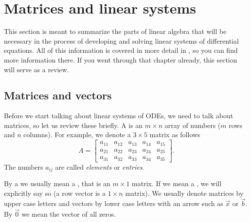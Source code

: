 \section{Matrices and linear systems} \label{sec:matrix}



This section is meant to summarize the parts of linear algebra that will be necessary in the process of developing and solving linear systems of differential equations. All of this information is covered in more detail in , so you can find more information there. If you went through that chapter already, this section will serve as a review.

\subsection{Matrices and vectors}

Before we start talking about linear systems of ODEs, we need to
talk about matrices, so let us review these briefly.  A \emph{}
is an $m
\times n$ array of numbers ($m$ rows and $n$ columns).  For example, we denote
a $3 \times 5$ matrix as follows
\begin{equation*}
A = 
\begin{bmatrix}
a_{11} & a_{12} & a_{13} & a_{14} & a_{15} \\
a_{21} & a_{22} & a_{23} & a_{24} & a_{25} \\
a_{31} & a_{32} & a_{33} & a_{34} & a_{35}
\end{bmatrix} .
\end{equation*}
The numbers $a_{ij}$ are called \emph{elements}
or \emph{entries}.

By a \emph{} we usually mean a
\emph{}, that is an $m \times 1$ matrix.
If we mean a \emph{},
we will explicitly say so (a row vector is a $1 \times n$ matrix).
We usually denote
matrices by upper case letters and vectors by lower case letters with an
arrow such as $\vec{x}$ or $\vec{b}$.  By $\vec{0}$ we mean the vector
of all zeros.

